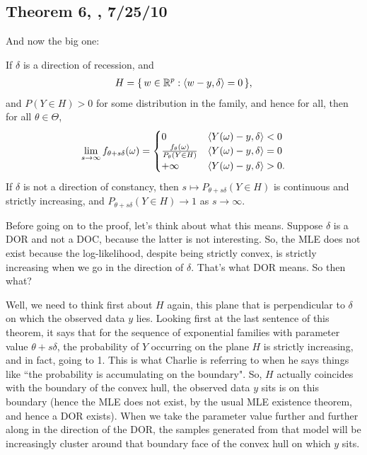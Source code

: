 \subsection{Theorem 6, \citet[p. 271]{Geyer:gdor}, 7/25/10}
And now the big one:
\begin{theorem}
If $\delta$ is a direction of recession, and
\begin{align*}
H = \{\,  w \in {\mathbb R}^p: \langle w-y,\delta \rangle=0  \,\},
\end{align*}
and $P(Y \in H) > 0$ for some distribution in the family, and hence for all, then for 
all $\theta \in \Theta$,
\begin{align*}
\lim_{s \to \infty} f_{\theta+s\delta}(\omega) = 
			\begin{cases} 
			0 								& \langle Y(\omega) - y ,\delta \rangle < 0 \\
			\frac{f_\theta(\omega)}{P_\theta(Y \in H)} 	& \langle Y(\omega) - y ,
\delta \rangle = 0 \\
			+\infty							& \langle Y(\omega) - y ,\delta \rangle > 0.
		\end{cases}
\end{align*}
If $\delta$ is not a direction of constancy, then $s \mapsto P_{\theta+s\delta}( Y 
\in H)$ is continuous and strictly increasing, and $P_{\theta+s\delta}( Y \in H) \to 
1$ as $s \to \infty$.
\end{theorem}
Before going on to the proof, let's think about what this means.  Suppose $\delta$ is 
a DOR and not a DOC, because the latter is not interesting.  So, the MLE does not 
exist because the log-likelihood, despite being strictly convex, is strictly 
increasing when we go in the direction of $\delta$.  That's what DOR means.  So then 
what?

Well, we need to think first about $H$ again, this plane that is perpendicular to $
\delta$ on which the observed data $y$ lies.  Looking first at the last sentence of 
this theorem, it says that for the sequence of exponential families with parameter 
value $\theta+s\delta$, the probability of $Y$ occurring on the plane $H$ is strictly 
increasing, and in fact, going to 1.  This is what Charlie is referring to when he 
says things like ``the probability is accumulating on the boundary".  So, $H$ 
actually coincides with the boundary of the convex hull, the observed data $y$ sits 
is on this boundary (hence the MLE does not exist, by the usual MLE existence 
theorem, and hence a DOR exists).  When we take the parameter value further and 
further along in the direction of the DOR, the samples generated from that model will 
be increasingly cluster around that boundary face of the convex hull on which $y$ 
sits.

